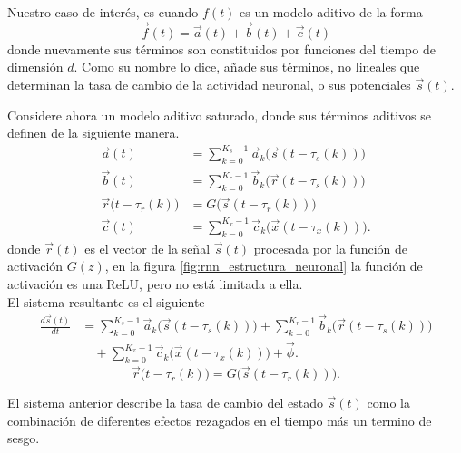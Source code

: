 \documentclass[12pt,letterpaper]{article}
\begin{document}
Nuestro caso de interés, es cuando $f(t)$ es un modelo aditivo de la forma 
\begin{equation}
\vec{f}(t) = \vec{a}(t) + \vec{b}(t) + \vec{c}(t)
\end{equation}
donde nuevamente sus términos son constituidos por funciones del tiempo de dimensión $d$. Como su nombre lo dice, añade sus términos, no lineales que determinan la tasa de cambio de la actividad neuronal, o sus potenciales $\vec{s}(t)$.

Considere ahora un modelo aditivo saturado, donde sus términos aditivos se definen de la siguiente manera. 
\begin{align}
    \vec{a}(t) &= \sum_{k=0}^{K_s-1} \vec{a}_k \big( 
    \vec{s}(t-\tau_s(k))  \big) \\
    \vec{b}(t) &= \sum_{k=0}^{K_r-1} \vec{b}_k \big( 
    \vec{r}(t-\tau_s(k)) \big) \\
    \vec{r}\big(t-\tau_r(k)\big) &= G\big(\vec{s}(t-\tau_r(k)) \big) \\
    \vec{c}(t) &= \sum_{k=0}^{K_x-1} \vec{c}_k\big( 
    \vec{x}(t-\tau_x(k))\big).
\end{align}
donde $\vec{r}(t)$ es el vector de la señal $\vec{s}(t)$ procesada por la función de activación $G(z)$, en la figura \ref{fig:rnn_estructura_neuronal} la función de activación es una ReLU, pero no está limitada a ella.\\

El sistema resultante es el siguiente 
\begin{equation}
\begin{aligned}
    \frac{d\vec{s}(t)}{dt} &= \sum_{k=0}^{K_s-1} \vec{a}_k \big( 
    \vec{s}(t-\tau_s(k))  \big) +  \sum_{k=0}^{K_r-1} \vec{b}_k \big( 
    \vec{r}(t-\tau_s(k)) \big) \\
    &\quad + \sum_{k=0}^{K_x-1} \vec{c}_k\big( 
    \vec{x}(t-\tau_x(k))\big) + \vec{\phi}.
\end{aligned}
\end{equation}
\begin{equation}
    \vec{r}\big(t-\tau_r(k)\big) = G\big(\vec{s}(t-\tau_r(k)) \big).
\end{equation}

El sistema anterior describe la tasa de cambio del estado $\vec{s}(t)$ como la combinación de diferentes efectos rezagados en el tiempo más un termino de sesgo.\\
\end{document}
